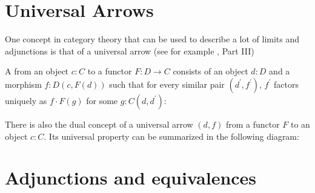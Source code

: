 \section{Universal Arrows}

One concept in category theory that can be used to describe a lot of limits and adjunctions is that of a universal arrow (see for example \cite{MacLane}, Part III)
\begin{definition}
  A  from an object $ c: C $ to a functor $ F: D \to C $ consists of an object $ d: D $ and a morphism $ f: D(c, F(d)) $ such that for every similar pair $ (d^\prime, f^\prime) $, $ f^\prime $ factors uniquely as $ f \cdot F(g) $ for some $ g: C(d, d^\prime) $:
  \begin{center}
  \end{center}
\end{definition}

There is also the dual concept of a universal arrow $ (d, f) $ from a functor $ F $ to an object $ c: C $. Its universal property can be summarized in the following diagram:
\begin{center}
\end{center}

\section{Adjunctions and equivalences}

